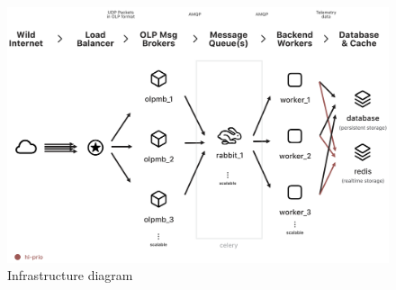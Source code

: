









\begin{figure}
    \centering
    \includegraphics[scale=0.29, angle=90]{assets/infrastructure-diagram.png}
    \caption{Infrastructure diagram~\cite{dataInfrastructure}}
    \label{fig:infrastracture-diagram}
\end{figure}
